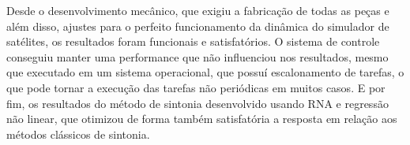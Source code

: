 Desde o desenvolvimento mecânico, que exigiu a fabricação de todas as peças e além disso, ajustes para o perfeito funcionamento da dinâmica do simulador de satélites, os resultados foram funcionais e satisfatórios. O sistema de controle conseguiu manter uma performance que não influenciou nos resultados, mesmo que executado em um sistema operacional, que possuí escalonamento de tarefas, o que pode tornar a execução das tarefas não periódicas em muitos casos. E por fim, os resultados do método de sintonia desenvolvido usando RNA e regressão não linear, que otimizou de forma também satisfatória a resposta em relação aos métodos clássicos de sintonia.
